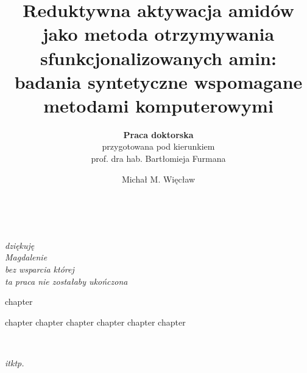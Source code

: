 \documentclass[
  a4paper,
  twoside,
  justified,
  nobib,
  nofonts,
  marginals=raggedright,
]{tufte-book}
\title[Reduktywna aktywacja amidów\ldots]%
    {Reduktywna aktywacja amidów jako metoda otrzymywania
    sfunkcjonalizowanych amin: badania syntetyczne wspomagane metodami komputerowymi}
\subtitle{\textbf{Praca doktorska} \\ przygotowana pod kierunkiem \\ prof. dra hab. Bartłomieja Furmana}
\author{Michał M. Więcław}
\begin{document}
\frontmatter
\maketitle

\cleardoublepage%
\thispagestyle{empty}%
~\vfill%
\vfill%
\begin{fullwidth}%
\raggedleft\noindent\fontsize{16}{26}\selectfont\itshape%
\nohyphenation%
dziękuję \\
Magdalenie \\
bez wsparcia której \\
ta praca nie zostałaby ukończona
\end{fullwidth}%
\vfill%

\tableofcontents

{chapter}%

\mainmatter
{chapter}%
{chapter}%
{chapter}%
{chapter}%
{chapter}%
{chapter}%

\backmatter
\cleardoublepage%
\thispagestyle{empty}%
~\vfill%
\vfill%
{%
  \begin{fullwidth}%
    \raggedleft\noindent\fontsize{16}{26}\selectfont\itshape%
    itktp.\hspace*{0.2\textwidth}\par%
  \end{fullwidth}%
}%
\vfill%
\end{document}
